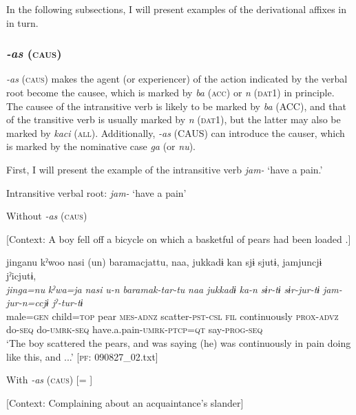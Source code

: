 In the following subsections, I will present examples of the derivational affixes in  in turn.

\subsubsection{\textit{-as} (\textsc{caus})}

\textit{-as} (\textsc{caus}) makes the agent (or experiencer) of the action indicated by the verbal root become the causee, which is marked by \textit{ba} (\textsc{acc}) or \textit{n} (\textsc{dat1}) in principle. The causee of the intransitive verb is likely to be marked by \textit{ba} (ACC), and that of the transitive verb is usually marked by \textit{n} (\textsc{dat1}), but the latter may also be marked by \textit{kaci} (\textsc{all}). Additionally, \textit{-as} (CAUS) can introduce the causer, which is marked by the nominative case \textit{ga} (or \textit{nu}).

  First, I will present the example of the intransitive verb \textit{jam-} ‘have a pain.’

\ea\label{ex:8-119}
  Intransitive verbal root: \textit{jam-} ‘have a pain’

\ea Without \textit{-as} (\textsc{caus})

  [Context: A boy fell off a bicycle on which a basketful of pears had been loaded .]

  {\TM}
\glll  jinganu  kˀwoo  nasi  (un)  baramacjattu,  naa,   jukkadɨ  kan  sjɨ  sjutɨ,    jamjuncjɨ  jˀicjutɨ,\\
\textit{jinga=nu}  \textit{kˀwa=ja}  \textit{nasi}  \textit{u-n}  \textit{baramak-tar-tu}  \textit{naa}    \textit{jukkadɨ}  \textit{ka-n}  \textit{sɨr-tɨ}  \textit{sɨr-jur-tɨ}    \textit{jam-jur-n=ccjɨ  jˀ-tur-tɨ}
\\
    male=\textsc{gen}  child=\textsc{top}  pear  \textsc{mes}-\textsc{adnz}  scatter-\textsc{pst}-\textsc{csl}  \textsc{fil}   continuously  \textsc{prox}-\textsc{advz}  do-\textsc{seq}  do-\textsc{umrk}-\textsc{seq}  have.a.pain-\textsc{umrk}-\textsc{ptcp}=\textsc{qt}  say-\textsc{prog}-\textsc{seq}\\
\glt ‘The boy scattered the pears, and was saying (he) was continuously in pain doing like this, and ...’ [\textsc{pf}: 090827\_02.txt]


\ex With \textit{-as} (\textsc{caus}) [= ]

  [Context: Complaining about an acquaintance’s slander]


